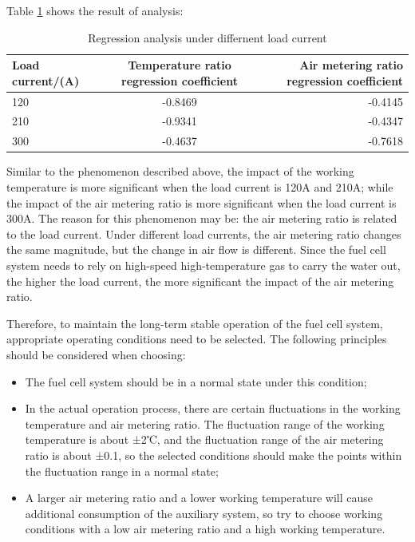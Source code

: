 \par
Table \ref{tab:RegressionAnalysis} shows the result of analysis:
\begin{table}
	\centering
	\begin{center}
		\caption{Regression analysis under differnent load current}
		\label{tab:RegressionAnalysis}
		\begin{tabular}{l||c|r}
			\hline
			\textbf{Load current/(A)} & \textbf{Temperature ratio regression coefficient} & \textbf{Air metering ratio regression coefficient} \\
			\hline
			120                       & -0.8469                                           & -0.4145                                            \\
			210                       & -0.9341                                           & -0.4347                                            \\
			300                       & -0.4637                                           & -0.7618                                            \\
			\hline
		\end{tabular}
	\end{center}
\end{table}
Similar to the phenomenon described above, the impact of the working temperature is more significant when the load current is 120A and 210A; while the impact of the air metering ratio is more significant when the load current is 300A. The reason for this phenomenon may be: the air metering ratio is related to the load current. Under different load currents, the air metering ratio changes the same magnitude, but the change in air flow is different. Since the fuel cell system needs to rely on high-speed high-temperature gas to carry the water out, the higher the load current, the more significant the impact of the air metering ratio.
\par
Therefore, to maintain the long-term stable operation of the fuel cell system, appropriate operating conditions need to be selected. The following principles should be considered when choosing:
\begin{itemize}
	\item The fuel cell system should be in a normal state under this condition;
	\item In the actual operation process, there are certain fluctuations in the working temperature and air metering ratio. The fluctuation range of the working temperature is about ±2℃, and the fluctuation range of the air metering ratio is about ±0.1, so the selected conditions should make the points within the fluctuation range in a normal state;
	\item A larger air metering ratio and a lower working temperature will cause additional consumption of the auxiliary system, so try to choose working conditions with a low air metering ratio and a high working temperature.
\end{itemize}
